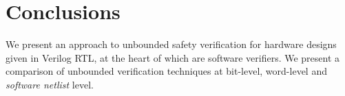 \section{Conclusions}
We present an approach to unbounded safety verification for hardware
designs given in Verilog RTL, at the heart of which are software
verifiers.  We present a comparison of unbounded verification
techniques at bit-level, word-level and \emph{software netlist} level.

